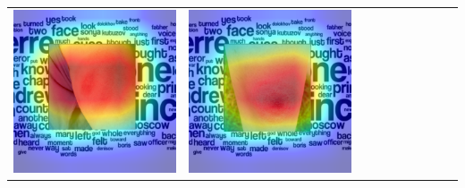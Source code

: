 \begin{landscape}
\begin{table}[]
\begin{tabular}{@{}c c c c c c c c c c@{}}
			\includegraphics[width=.12\textheight ,keepaspectratio]{images/pretraining/gradcam/3/XceptionCombinedGradCam.png} &
			\includegraphics[width=.12\textheight ,keepaspectratio]{images/pretraining/gradcam/9/XceptionCombinedGradCam.png}
			\\\cmidrule(lr){1-10}
			

\end{tabular}
\end{table}
\end{landscape}
